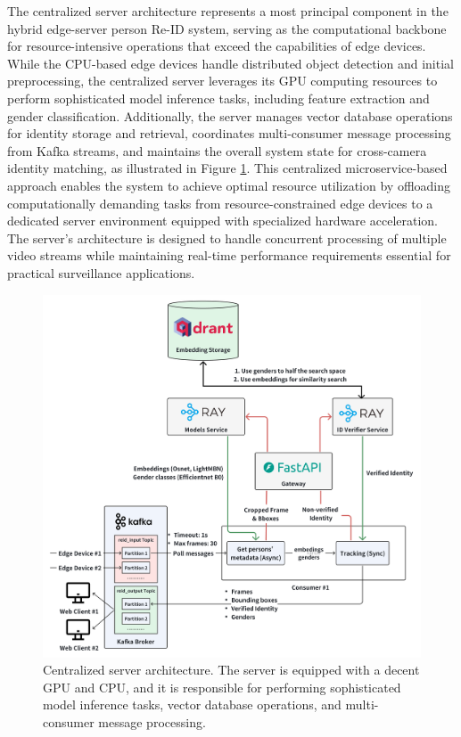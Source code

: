 The centralized server architecture represents a most principal component in the hybrid edge-server person Re-ID system, serving as the computational backbone for resource-intensive operations that exceed the capabilities of edge devices. While the CPU-based edge devices handle distributed object detection and initial preprocessing, the centralized server leverages its GPU computing resources to perform sophisticated model inference tasks, including feature extraction and gender classification. Additionally, the server manages vector database operations for identity storage and retrieval, coordinates multi-consumer message processing from Kafka streams, and maintains the overall system state for cross-camera identity matching, as illustrated in Figure \ref{fig:centralized_server_overview}. This centralized microservice-based approach enables the system to achieve optimal resource utilization by offloading computationally demanding tasks from resource-constrained edge devices to a dedicated server environment equipped with specialized hardware acceleration. The server's architecture is designed to handle concurrent processing of multiple video streams while maintaining real-time performance requirements essential for practical surveillance applications.

\newpage
\begin{figure}[!htbp]
    \centering
    \includegraphics[width=1.1\textwidth]{Figure/centralized_overview.png}
    \caption{Centralized server architecture. The server is equipped with a decent GPU and CPU, and it is responsible for performing sophisticated model inference tasks, vector database operations, and multi-consumer message processing.}
    \label{fig:centralized_server_overview}
\end{figure}

